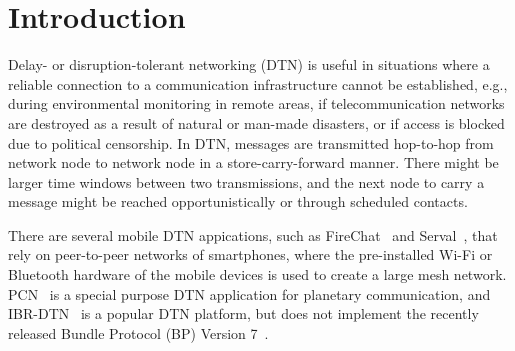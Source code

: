 \section{Introduction}
\label{sec:intro}

Delay- or disruption-tolerant networking (DTN) is useful in situations where a reliable connection to a communication infrastructure cannot be established, e.g., during environmental monitoring in remote areas, if telecommunication networks are destroyed as a result of natural or man-made disasters, or 
if access is blocked due to political censorship. In DTN, messages are transmitted hop-to-hop from network node to network node in a store-carry-forward manner. 
There might be larger time windows between two transmissions, and the next node to carry a message might be reached opportunistically or through scheduled contacts.

There are several mobile DTN appications, such as FireChat~\cite{garden2015firechat} and Serval~\cite{gardner2011serval}, that rely on peer-to-peer networks of smartphones, where
the pre-installed Wi-Fi or Bluetooth hardware of the mobile devices is used to create a large mesh network.
{\textmu}PCN~\cite{feldmann2015upcn} is a special purpose DTN application for planetary communication, and IBR-DTN~\cite{doering2008ibr} is a popular DTN platform, but does not implement the recently released Bundle Protocol (BP) Version 7~\cite{dtn_bp7v13}.

